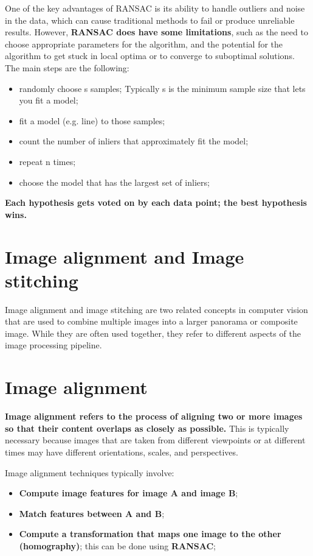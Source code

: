 \documentclass{article}
\begin{document}
One of the key advantages of RANSAC is its ability to handle outliers and noise in the data, which can cause traditional methods to fail or produce unreliable results. However, \textbf{RANSAC does have some limitations}, such as the need to choose appropriate parameters for the algorithm, and the potential for the algorithm to get stuck in local optima or to converge to suboptimal solutions.\\

The main steps are the following:
\begin{itemize}
    \item randomly choose s samples; Typically s is the minimum sample size that lets you fit a model;
    \item fit a model (e.g. line) to those samples;
    \item count the number of inliers that approximately fit the model;
    \item repeat n times;
    \item choose the model that has the largest set of inliers;
\end{itemize}

\textbf{Each hypothesis gets voted on by each data point; the best hypothesis wins.}

\newpage

\section*{Image alignment and Image stitching}

Image alignment and image stitching are two related concepts in computer vision that are used to combine multiple images into a larger panorama or composite image. While they are often used together, they refer to different aspects of the image processing pipeline.

\section*{Image alignment}

\textbf{Image alignment refers to the process of aligning two or more images so that their content overlaps as closely as possible.} This is typically necessary because images that are taken from different viewpoints or at different times may have different orientations, scales, and perspectives.

Image alignment techniques typically involve:
\begin{itemize}
    \item \textbf{Compute image features for image A and image B};
    \item \textbf{Match features between A and B};
    \item \textbf{Compute a transformation that maps one image to the other (homography)}; this can be done using \textbf{RANSAC};
\end{itemize}
\end{document}
